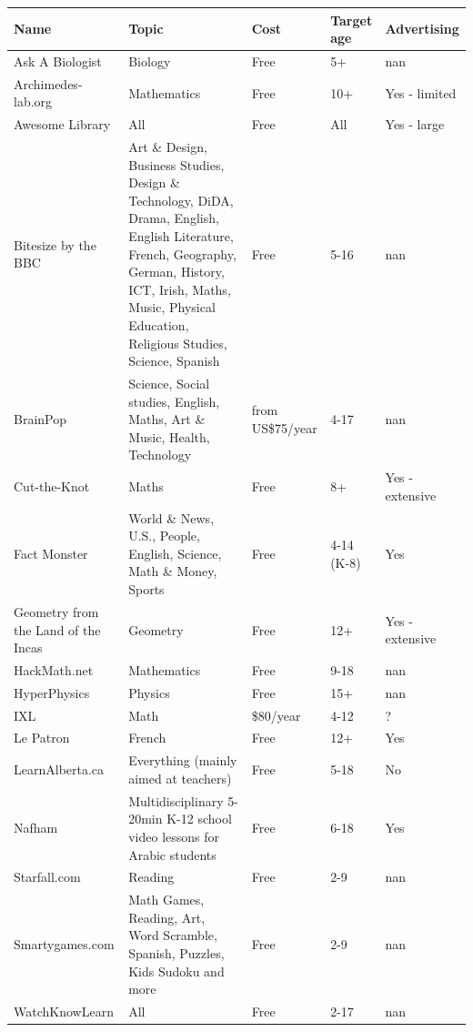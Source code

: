 \documentclass{article}
\begin{document}
\begin{tabular}{lllll}
\toprule
Name & Topic & Cost & Target age & Advertising \\
\midrule
Ask A Biologist & Biology & Free & 5+ & nan \\
Archimedes-lab.org & Mathematics & Free & 10+ & Yes - limited \\
Awesome Library & All & Free & All & Yes - large \\
Bitesize by the BBC & Art \& Design, Business Studies, Design \& Technology, DiDA, Drama, English, English Literature, French, Geography, German, History, ICT, Irish, Maths, Music, Physical Education, Religious Studies, Science, Spanish & Free & 5-16 & nan \\
BrainPop & Science, Social studies, English, Maths, Art \& Music, Health, Technology & from US\$75/year & 4-17 & nan \\
Cut-the-Knot & Maths & Free & 8+ & Yes - extensive \\
Fact Monster & World \& News, U.S., People, English, Science, Math \& Money, Sports & Free & 4-14 (K-8) & Yes \\
Geometry from the Land of the Incas & Geometry & Free & 12+ & Yes - extensive \\
HackMath.net & Mathematics & Free & 9-18 & nan \\
HyperPhysics & Physics & Free & 15+ & nan \\
IXL & Math & \$80/year & 4-12 & ? \\
Le Patron & French & Free & 12+ & Yes \\
LearnAlberta.ca & Everything (mainly aimed at teachers) & Free & 5-18 & No \\
Nafham & Multidisciplinary 5-20min K-12 school video lessons for Arabic students & Free & 6-18 & Yes \\
Starfall.com & Reading & Free & 2-9 & nan \\
Smartygames.com & Math Games, Reading, Art, Word Scramble, Spanish, Puzzles, Kids Sudoku and more & Free & 2-9 & nan \\
WatchKnowLearn & All & Free & 2-17 & nan \\
\bottomrule
\end{tabular}
\end{document}
